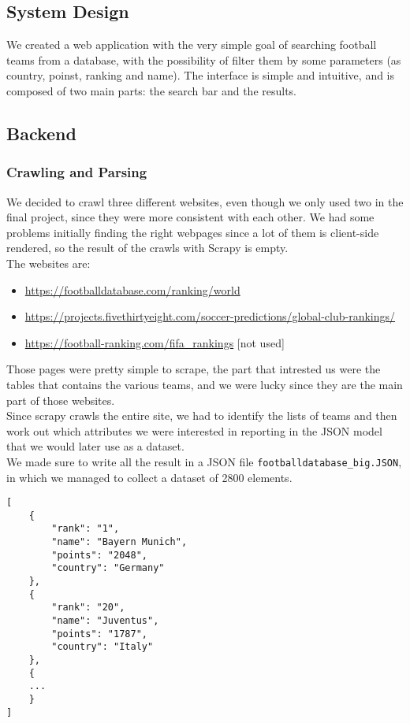 \documentclass{article}
\begin{document}
\subsection{System Design}
We created a web application with the very simple goal of searching football teams from a database, with the possibility of filter them by some parameters (as country, poinst, ranking and name).
The interface is simple and intuitive, and is composed of two main parts: the search bar and the results.

\subsection{Backend}
\subsubsection{Crawling and Parsing}
We decided to crawl three different websites, even though we only used two in the final project, since they were more consistent with each other. We had some problems initially finding the right webpages since a lot of them is client-side rendered, so the result of the crawls with Scrapy is empty. \\
The websites are:
\begin{itemize}
    \item \url{https://footballdatabase.com/ranking/world}
    \item \url{https://projects.fivethirtyeight.com/soccer-predictions/global-club-rankings/}
    \item \url{https://football-ranking.com/fifa_rankings} [not used]
\end{itemize}
Those pages were pretty simple to scrape, the part that intrested us were the tables that contains the various teams, and we were lucky since they are the main part of those websites.\\
Since scrapy crawls the entire site, we had to identify the lists of teams and then work out which attributes we were interested in reporting in the JSON model that we would later use as a dataset.\\ We made sure to write all the result in a JSON file \texttt{footballdatabase\_big.JSON}, in which we managed to collect a dataset of 2800 elements.\\
\begin{lstlisting}[caption={Snippet of the JSON model}, captionpos=b]
[
    { 
        "rank": "1",
        "name": "Bayern Munich",
        "points": "2048",
        "country": "Germany"
    },
    { 
        "rank": "20",
        "name": "Juventus",
        "points": "1787",
        "country": "Italy"
    },
    {
    ...
    }
]
\end{lstlisting}
\end{document}
